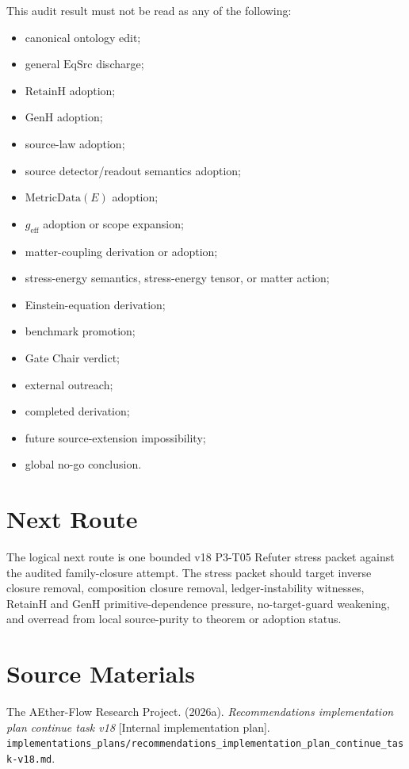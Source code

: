 \documentclass[11pt]{article}
\newcommand{\EqSrc}{\mathrm{EqSrc}}
\newcommand{\RetainH}{\mathrm{RetainH}}
\newcommand{\GenH}{\mathrm{GenH}}
\begin{document}
This audit result must not be read as any of the following:
\begin{itemize}[leftmargin=*]
  \item canonical ontology edit;
  \item general \(\EqSrc\) discharge;
  \item \(\RetainH\) adoption;
  \item \(\GenH\) adoption;
  \item source-law adoption;
  \item source detector/readout semantics adoption;
  \item \(\mathrm{MetricData}(E)\) adoption;
  \item \(g_{\mathrm{eff}}\) adoption or scope expansion;
  \item matter-coupling derivation or adoption;
  \item stress-energy semantics, stress-energy tensor, or matter action;
  \item Einstein-equation derivation;
  \item benchmark promotion;
  \item Gate Chair verdict;
  \item external outreach;
  \item completed derivation;
  \item future source-extension impossibility;
  \item global no-go conclusion.
\end{itemize}

\section{Next Route}

The logical next route is one bounded v18 P3-T05 Refuter stress packet against
the audited family-closure attempt. The stress packet should target inverse
closure removal, composition closure removal, ledger-instability witnesses,
RetainH and GenH primitive-dependence pressure, no-target-guard weakening, and
overread from local source-purity to theorem or adoption status.

\section{Source Materials}

The AEther-Flow Research Project. (2026a). \emph{Recommendations
implementation plan continue task v18} [Internal implementation plan].
\texttt{implementations\_plans/recommendations\_implementation\_plan\_continue\_task-v18.md}.
\end{document}
